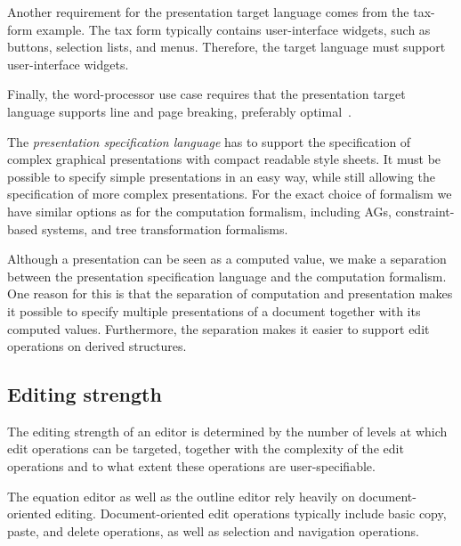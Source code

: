 Another requirement for the presentation target language comes from the tax-form example. The tax form typically contains user-interface widgets, such as buttons, selection lists, and menus. Therefore, the target language must support user-interface widgets.


Finally, the word-processor use case requires that the presentation target language supports line and page breaking, preferably optimal~\cite{knuth82breaking}. 

The {\em presentation specification language} has to support the specification of complex graphical presentations with compact readable style sheets. It must be possible to specify simple presentations in an easy way, while still allowing the specification of more complex presentations. For the exact choice of formalism we have similar options as for the computation formalism, including AGs, constraint-based systems, and tree transformation formalisms.

Although a presentation can be seen as a computed value, we make a separation between the presentation specification language and the computation formalism. One reason for this is that the separation of computation and presentation makes it possible to specify multiple presentations of a document together with its computed values. Furthermore, the separation makes it easier to support edit operations on derived structures.


%																
\subsection{Editing strength}

The editing strength of an editor is determined by the number of levels at which edit operations can be targeted, together with the complexity of the edit operations and to what extent these operations are user-specifiable. 



The equation editor as well as the outline editor rely heavily on document-oriented editing. Document-oriented edit operations typically include basic copy, paste, and delete operations, as well as selection and navigation operations.


